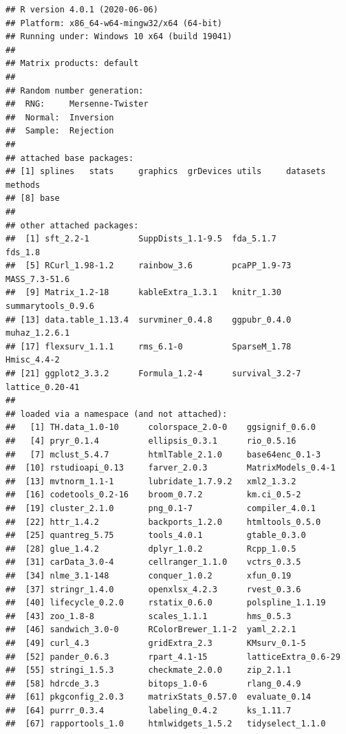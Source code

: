 \documentclass[]{article}
\begin{document}
\begin{verbatim}
## R version 4.0.1 (2020-06-06)
## Platform: x86_64-w64-mingw32/x64 (64-bit)
## Running under: Windows 10 x64 (build 19041)
## 
## Matrix products: default
## 
## Random number generation:
##  RNG:     Mersenne-Twister 
##  Normal:  Inversion 
##  Sample:  Rejection 
##  
## attached base packages:
## [1] splines   stats     graphics  grDevices utils     datasets  methods  
## [8] base     
## 
## other attached packages:
##  [1] sft_2.2-1          SuppDists_1.1-9.5  fda_5.1.7          fds_1.8           
##  [5] RCurl_1.98-1.2     rainbow_3.6        pcaPP_1.9-73       MASS_7.3-51.6     
##  [9] Matrix_1.2-18      kableExtra_1.3.1   knitr_1.30         summarytools_0.9.6
## [13] data.table_1.13.4  survminer_0.4.8    ggpubr_0.4.0       muhaz_1.2.6.1     
## [17] flexsurv_1.1.1     rms_6.1-0          SparseM_1.78       Hmisc_4.4-2       
## [21] ggplot2_3.3.2      Formula_1.2-4      survival_3.2-7     lattice_0.20-41   
## 
## loaded via a namespace (and not attached):
##   [1] TH.data_1.0-10      colorspace_2.0-0    ggsignif_0.6.0     
##   [4] pryr_0.1.4          ellipsis_0.3.1      rio_0.5.16         
##   [7] mclust_5.4.7        htmlTable_2.1.0     base64enc_0.1-3    
##  [10] rstudioapi_0.13     farver_2.0.3        MatrixModels_0.4-1 
##  [13] mvtnorm_1.1-1       lubridate_1.7.9.2   xml2_1.3.2         
##  [16] codetools_0.2-16    broom_0.7.2         km.ci_0.5-2        
##  [19] cluster_2.1.0       png_0.1-7           compiler_4.0.1     
##  [22] httr_1.4.2          backports_1.2.0     htmltools_0.5.0    
##  [25] quantreg_5.75       tools_4.0.1         gtable_0.3.0       
##  [28] glue_1.4.2          dplyr_1.0.2         Rcpp_1.0.5         
##  [31] carData_3.0-4       cellranger_1.1.0    vctrs_0.3.5        
##  [34] nlme_3.1-148        conquer_1.0.2       xfun_0.19          
##  [37] stringr_1.4.0       openxlsx_4.2.3      rvest_0.3.6        
##  [40] lifecycle_0.2.0     rstatix_0.6.0       polspline_1.1.19   
##  [43] zoo_1.8-8           scales_1.1.1        hms_0.5.3          
##  [46] sandwich_3.0-0      RColorBrewer_1.1-2  yaml_2.2.1         
##  [49] curl_4.3            gridExtra_2.3       KMsurv_0.1-5       
##  [52] pander_0.6.3        rpart_4.1-15        latticeExtra_0.6-29
##  [55] stringi_1.5.3       checkmate_2.0.0     zip_2.1.1          
##  [58] hdrcde_3.3          bitops_1.0-6        rlang_0.4.9        
##  [61] pkgconfig_2.0.3     matrixStats_0.57.0  evaluate_0.14      
##  [64] purrr_0.3.4         labeling_0.4.2      ks_1.11.7          
##  [67] rapportools_1.0     htmlwidgets_1.5.2   tidyselect_1.1.0   

\end{verbatim}
\end{document}
